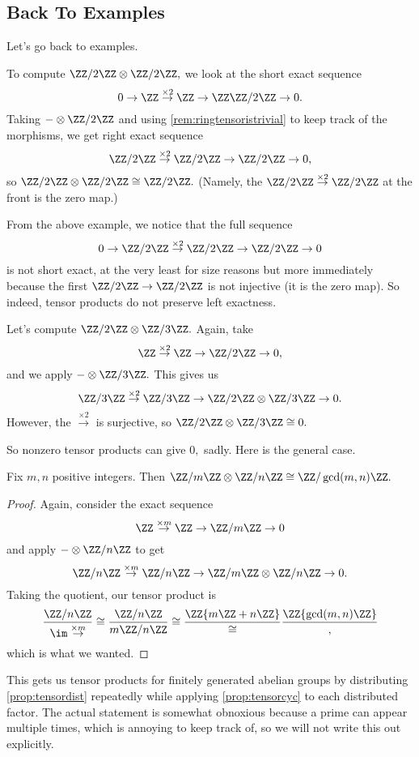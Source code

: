 \documentclass[../notes.tex]{subfiles}
\begin{document}
\subsection{Back To Examples}
Let's go back to examples.
\begin{example}
	To compute $\ZZ/2\ZZ\otimes\ZZ/2\ZZ,$ we look at the short exact sequence
	\[0\to\ZZ\stackrel{\times2}\to\ZZ\to\ZZ\ZZ/2\ZZ\to0.\]
	Taking $-\otimes\ZZ/2\ZZ$ and using \autoref{rem:ringtensoristrivial} to keep track of the morphisms, we get right exact sequence
	\[\ZZ/2\ZZ\stackrel{\times2}\to\ZZ/2\ZZ\to\ZZ/2\ZZ\to0,\]
	so $\ZZ/2\ZZ\otimes\ZZ/2\ZZ\cong\ZZ/2\ZZ.$ (Namely, the $\ZZ/2\ZZ\stackrel{\times2}\to\ZZ/2\ZZ$ at the front is the zero map.)
\end{example}
From the above example, we notice that the full sequence
\[0\to\ZZ/2\ZZ\stackrel{\times2}\to\ZZ/2\ZZ\to\ZZ/2\ZZ\to0\]
is not short exact, at the very least for size reasons but more immediately because the first $\ZZ/2\ZZ\to\ZZ/2\ZZ$ is not injective (it is the zero map). So indeed, tensor products do not preserve left exactness.
\begin{example}
	Let's compute $\ZZ/2\ZZ\otimes\ZZ/3\ZZ.$ Again, take
	\[\ZZ\stackrel{\times2}\to\ZZ\to\ZZ/2\ZZ\to0,\]
	and we apply $-\otimes\ZZ/3\ZZ.$ This gives us
	\[\ZZ/3\ZZ\stackrel{\times2}\to\ZZ/3\ZZ\to\ZZ/2\ZZ\otimes\ZZ/3\ZZ\to0.\]
	However, the $\stackrel{\times2}\to$ is surjective, so $\ZZ/2\ZZ\otimes\ZZ/3\ZZ\cong0.$
\end{example}
So nonzero tensor products can give $0,$ sadly. Here is the general case.
\begin{exercise} \label{prop:tensorcyc}
	Fix $m,n$ positive integers. Then $\ZZ/m\ZZ\otimes\ZZ/n\ZZ\cong\ZZ/\gcd(m,n)\ZZ.$
\end{exercise}
\begin{proof}
	Again, consider the exact sequence
	\[\ZZ\stackrel{\times m}\to\ZZ\to\ZZ/m\ZZ\to0\]
	and apply $-\otimes\ZZ/n\ZZ$ to get
	\[\ZZ/n\ZZ\stackrel{\times m}\to\ZZ/n\ZZ\to\ZZ/m\ZZ\otimes\ZZ/n\ZZ\to0.\]
	Taking the quotient, our tensor product is
	\[\frac{\ZZ/n\ZZ}{\im\stackrel{\times m}\to}\cong\frac{\ZZ/n\ZZ}{m\ZZ/n\ZZ}\cong\frac\ZZ{m\ZZ+n\ZZ}\cong\frac\ZZ{\gcd(m,n)\ZZ},\]
	which is what we wanted.
\end{proof}
This gets us tensor products for finitely generated abelian groups by distributing \autoref{prop:tensordist} repeatedly while applying \autoref{prop:tensorcyc} to each distributed factor. The actual statement is somewhat obnoxious because a prime can appear multiple times, which is annoying to keep track of, so we will not write this out explicitly.
\end{document}
